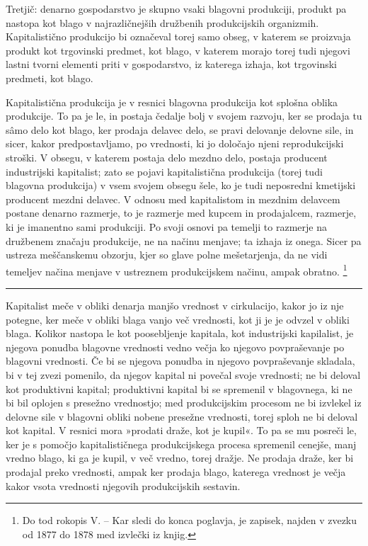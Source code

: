 \documentclass[kapital_02.tex]{subfiles}
\begin{document}
Tretjič: denarno gospodarstvo je skupno vsaki blagovni produkciji, produkt pa nastopa kot blago v najrazličnejših družbenih produkcijskih organizmih. Kapitalistično produkcijo bi označeval torej samo obseg, v katerem se proizvaja produkt kot trgovinski predmet, kot blago, v katerem morajo torej tudi njegovi lastni tvorni elementi priti v gospodarstvo, iz katerega izhaja, kot trgovinski predmeti, kot blago.

\setcounter{footnote}{6}
Kapitalistična produkcija je v resnici blagovna produkcija kot splošna oblika produkcije. To pa je le, in postaja čedalje bolj v svojem razvoju, ker se prodaja tu s\^amo delo kot blago, ker prodaja delavec delo, se pravi delovanje delovne sile, in sicer, kakor predpostavljamo, po vrednosti, ki \KPEstran jo določajo njeni reprodukcijski stroški. V obsegu, v katerem postaja delo mezdno delo, postaja producent industrijski kapitalist; zato se pojavi kapitalistična produkcija (torej tudi blagovna produkcija) v vsem svojem obsegu šele, ko je tudi neposredni kmetijski producent mezdni delavec. V odnosu med kapitalistom in mezdnim delavcem postane denarno razmerje, to je razmerje med kupcem in prodajalcem, razmerje, ki je imanentno sami produkciji. Po svoji osnovi pa temelji to razmerje na družbenem značaju produkcije, ne na načinu menjave; ta izhaja iz onega. Sicer pa ustreza meščanskemu obzorju, kjer so glave polne mešetarjenja, da ne vidi temeljev načina menjave v ustreznem produkcijskem načinu, ampak obratno. \footnote{Do tod rokopis V. -- Kar sledi do konca poglavja, je zapisek, najden v zvezku od 1877 do 1878 med izvlečki iz knjig.}
\medskip
\hrule
\medskip

Kapitalist meče v obliki denarja manjšo vrednost v cirkulacijo, kakor jo iz nje potegne, ker meče v obliki blaga vanjo več vrednosti, kot ji je je odvzel v obliki blaga. Kolikor nastopa le kot poosebljenje kapitala, kot industrijski kapilalist, je njegova ponudba blagovne vrednosti vedno večja ko njegovo povpraševanje po blagovni vrednosti. Če bi se njegova ponudba in njegovo povpraševanje skladala, bi v tej zvezi pomenilo, da njegov kapital ni povečal svoje vrednosti; ne bi deloval kot produktivni kapital; produktivni kapital bi se spremenil v blagovnega, ki ne bi bil oplojen s presežno vrednostjo; med produkcijskim procesom ne bi izvlekel iz delovne sile v blagovni obliki nobene presežne vrednosti, torej sploh ne bi deloval kot kapital. V resnici mora »prodati draže, kot je kupil«. To pa se mu posreči le, ker je s pomočjo kapitalističnega produkcijskega procesa spremenil cenejše, manj vredno blago, ki ga je kupil, v več vredno, torej dražje. Ne prodaja draže, ker bi prodajal preko vrednosti, ampak ker prodaja blago, katerega vrednost je večja kakor vsota vrednosti njegovih produkcijskih sestavin.
\end{document}
